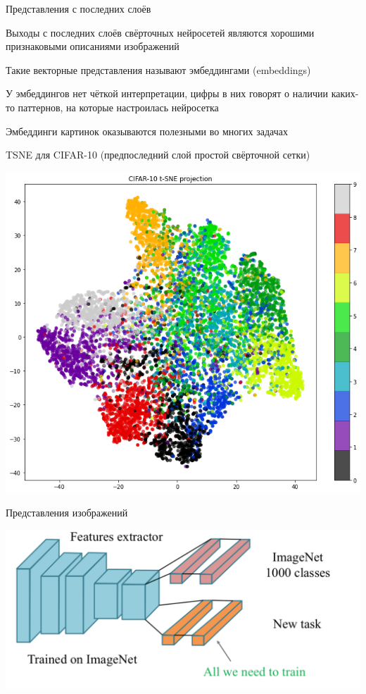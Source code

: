 \documentclass[notes,12pt, aspectratio=169]{beamer}
\newenvironment{wideitemize}{\itemize\addtolength{\itemsep}{10pt}}{\enditemize}
\begin{document}
\begin{frame}{Представления с последних слоёв}
	\begin{wideitemize}
		\item  Выходы с последних слоёв свёрточных нейросетей являются хорошими признаковыми описаниями изображений
		\item Такие векторные представления называют \alert{эмбеддингами (embeddings)}
		\item У эмбеддингов нет чёткой интерпретации, цифры в них говорят о наличии каких-то паттернов, на которые настроилась нейросетка
		\item Эмбеддинги картинок оказываются полезными во многих задачах 
	\end{wideitemize}
\end{frame}


\begin{frame}{TSNE для CIFAR-10 (предпоследний слой простой свёрточной сетки)}
		\begin{center}
				\includegraphics[width=.5\linewidth]{tsne_conv.png}
		\end{center}
\end{frame}


\begin{frame}{Представления изображений}
		\begin{center}
				\includegraphics[width=.8\linewidth]{transfer_learning2.png}
		\end{center}
\end{frame}
\end{document}
